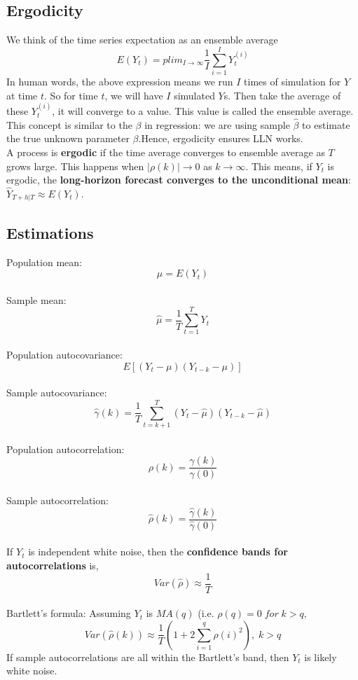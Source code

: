 \documentclass{article}
\begin{document}
\subsection{Ergodicity}
We think of the time series expectation as an ensemble average
$$E(Y_t) = plim_{I\rightarrow \infty} \frac{1}{I} \sum _{i=1}^I Y_t^{(i)}$$
In human words, the above expression means we run $I$ times of simulation for $Y$ at time $t$. So for time $t$, we will have $I$ simulated $Y$s. Then take the average of these $Y_t^{(i)}$, it will converge to a value. This value is called the ensemble average. This concept is similar to the $\beta$ in regression: we are using sample $\hat{\beta}$ to estimate the true unknown parameter $\beta$.Hence, ergodicity ensures LLN works.\\
A process is \textbf{ergodic} if the time average converges to ensemble average as $T$ grows large. This happens when $|\rho(k)| \rightarrow 0$ as $k \rightarrow \infty$. This means, if $Y_t$ is ergodic, the \textbf{long-horizon forecast converges to the unconditional mean}: $\hat{Y}_{T+h|T} \approx E(Y_t)$. 

\subsection{Estimations}
Population mean:
$$\mu = E(Y_t)$$\\
Sample mean:
$$\hat{\mu} = \frac{1}{T} \sum_{t=1}^T Y_t$$\\
Population autocovariance:
$$E[(Y_t - \mu)(Y_{t-k} - \mu)]$$\\
Sample autocovariance:
$$\hat{\gamma}(k) = \frac{1}{T} \sum_{t=k+1}^T (Y_t - \hat{\mu})(Y_{t-k} - \hat{\mu})$$\\
Population autocorrelation:
$$\rho(k) = \frac{\gamma(k)}{\gamma(0)}$$\\
Sample autocorrelation:
$$\hat{\rho}(k) = \frac{\hat{\gamma}(k)}{\hat{\gamma}(0)}$$\\
If $Y_t$ is independent white noise, then the \textbf{confidence bands for autocorrelations} is,
$$Var(\hat{\rho}) \approx \frac{1}{T}$$\\
Bartlett's formula: Assuming $Y_t$ is $MA(q)$ (i.e. $\rho(q) = 0 \; for \; k>q$, 
$$Var(\hat{\rho}(k)) \approx \frac{1}{T} (1 + 2\sum_{i=1}^q \rho(i)^2), \; k>q$$
If sample autocorrelations are all within the Bartlett's band, then $Y_t$ is likely white noise.
\end{document}
